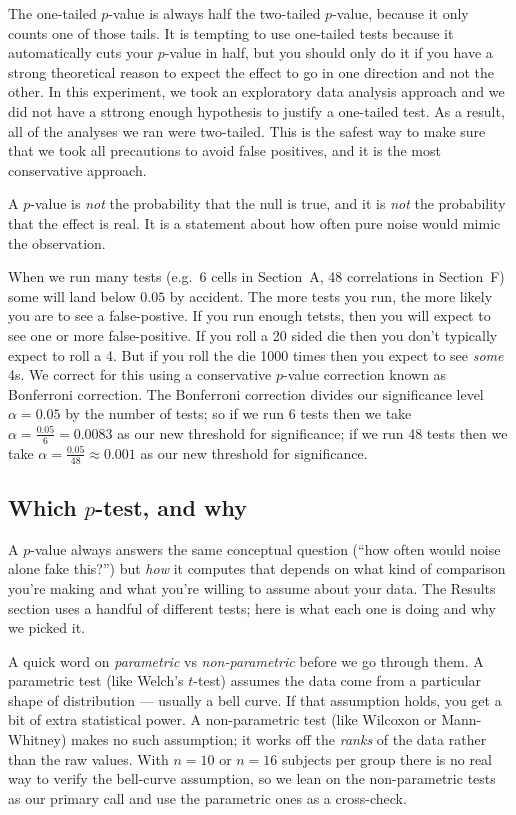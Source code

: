 \documentclass[11pt]{article}
\begin{document}
The one-tailed $p$-value is always half the two-tailed $p$-value, because it only counts one of those tails. It is tempting to use one-tailed tests because it automatically cuts your $p$-value in half, but you should only do it if you have a strong theoretical reason to expect the effect to go in one direction and not the other. 
In this experiment, we took an exploratory data analysis approach and we did not have a sttrong enough hypothesis to justify a one-tailed test. As a result, all of the analyses we ran were two-tailed. This is the safest way to make sure that we took all precautions to avoid false positives, and it is the most conservative approach. 

A $p$-value is \emph{not} the probability that the null is true, and
it is \emph{not} the probability that the effect is real. It is a
statement about how often pure noise would mimic the observation.

When we run many tests (e.g.\ 6 cells in Section~A, 48 correlations in
Section~F) some will land below $0.05$ by accident. The more tests you run, the more likely you are to see a false-postive.
If you run enough tetsts, then you will expect to see one or more false-positive. 
If you roll a 20 sided die then you don't typically expect to roll a 4. But if you roll the die 1000 times then you expect to see \textit{some} 4s.
We correct for this using a conservative $p$-value correction known as Bonferroni correction. The Bonferroni 
correction divides our significance level $\alpha = 0.05$ by the number of tests; so if we run 6 tests then we take $\alpha = \frac{0.05}{6} = 0.0083$ as our new threshold for significance; if we run 48 tests then we take $\alpha = \frac{0.05}{48} \approx 0.001$ as our new threshold for significance. 

\subsection{Which $p$-test, and why}

A $p$-value always answers the same conceptual question (``how often would noise alone fake this?'') but \emph{how} it computes that depends on what kind of comparison you're making and what you're willing to assume about your data. The Results section uses a handful of different tests; here is what each one is doing and why we picked it.

A quick word on \emph{parametric} vs \emph{non-parametric} before we go through them. A parametric test (like Welch's $t$-test) assumes the data come from a particular shape of distribution --- usually a bell curve. If that assumption holds, you get a bit of extra statistical power. A non-parametric test (like Wilcoxon or Mann-Whitney) makes no such assumption; it works off the \emph{ranks} of the data rather than the raw values. With $n = 10$ or $n = 16$ subjects per group there is no real way to verify the bell-curve assumption, so we lean on the non-parametric tests as our primary call and use the parametric ones as a cross-check.
\end{document}
